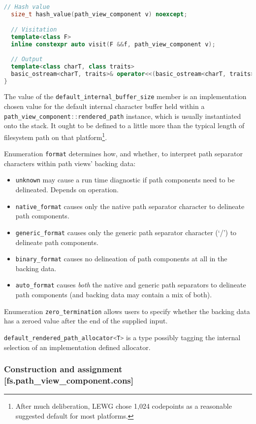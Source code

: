 \documentclass[11pt]{article}
\newcommand{\code}[2][cpp]{\lstinline[language=#1,basicstyle=\small\ttfamily]{#2}}
\begin{document}
\begin{lstlisting}[language=cpp]
  // Hash value
  size_t hash_value(path_view_component v) noexcept;

  // Visitation
  template<class F>
  inline constexpr auto visit(F &&f, path_view_component v);
  
  // Output
  template<class charT, class traits>
  basic_ostream<charT, traits>& operator<<(basic_ostream<charT, traits>& os, path_view_component v);
}
\end{lstlisting}

The value of the \code{default_internal_buffer_size} member is an implementation chosen value for the default internal character buffer held within a \code{path_view_component::rendered_path} instance, which is usually instantiated onto the stack. It ought to be defined to a little more than the typical length of filesystem path on that platform\footnote{After much deliberation, LEWG chose 1,024 codepoints as a reasonable suggested default for most platforms.}.

Enumeration \code{format} determines how, and whether, to interpret path separator characters within path views' backing data:
\begin{itemize}
    \item \code{unknown} may cause a run time diagnostic if path components need to be delineated. Depends on operation.
    \item \code{native_format} causes only the native path separator character to delineate path components.
    \item \code{generic_format} causes only the generic path separator character (`/') to delineate path components.
    \item \code{binary_format} causes no delineation of path components at all in the backing data.
    \item \code{auto_format} causes \emph{both} the native and generic path separators to delineate path components (and backing data may contain a mix of both).
\end{itemize}

Enumeration \code{zero_termination} allows users to specify whether the backing data has a zeroed value after the end of the supplied input.

\code{default_rendered_path_allocator<T>} is a type possibly tagging the internal selection of an implementation defined allocator.

\subsubsection*{Construction and assignment [fs.path\_view\_component.cons]}
\end{document}
